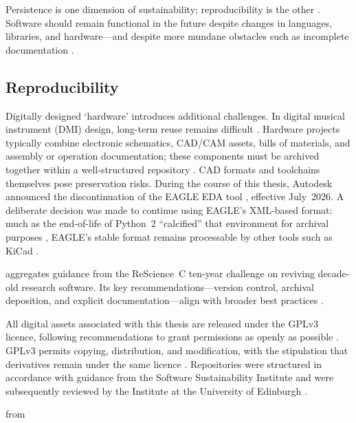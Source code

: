 Persistence is one dimension of sustainability; reproducibility is the other
\cite{perkel_challenge_2020}. Software should remain functional in the future
despite changes in languages, libraries, and hardware---and despite more mundane
obstacles such as incomplete documentation \cite{robert_reproducibility_2020}.

\subsection{Reproducibility}\label{hardware-reproducibility}

Digitally designed `hardware' introduces additional challenges. In digital
musical instrument (DMI) design, long-term reuse remains difficult
\cite{fiordelmondo_towards_2025}. Hardware projects typically combine electronic
schematics, CAD/CAM assets, bills of materials, and assembly or operation
documentation; these components must be archived together within a
well-structured repository \cite{calegario_documentation_2021}. CAD formats and
toolchains themselves pose preservation risks. During the course of this thesis,
Autodesk announced the discontinuation of the EAGLE EDA tool
\cite{autodesk_eagle_2024}, effective July~2026. A deliberate decision was made
to continue using EAGLE’s XML-based format: much as the end-of-life of Python~2
``calcified'' that environment for archival purposes \cite{rougier_loupe_2020},
EAGLE’s stable format remains processable by other tools such as KiCad
\cite{kicad_eagle_2024}.

\textcite{perkel_challenge_2020} aggregates guidance from the ReScience~C
ten-year challenge on reviving decade-old research software. Its key
recommendations---version control, archival deposition, and explicit
documentation---align with broader best practices \cite{smith_software_2016,
    stall_journal_2023}.

All digital assets associated with this thesis are released under the GPLv3
licence, following recommendations to grant permissions as openly as possible
\cite{stall_journal_2023}. GPLv3 permits copying, distribution, and
modification, with the stipulation that derivatives remain under the same
licence \cite{gplv3}. Repositories were structured in accordance with guidance
from the Software Sustainability Institute and were subsequently reviewed by the
Institute at the University of Edinburgh \cite{ssi_online_2025}.



from \citet{nime2021_4}

